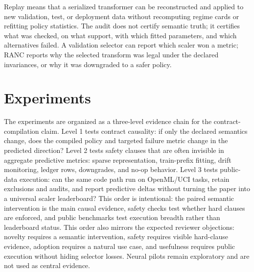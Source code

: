 \documentclass{article}
\begin{document}
Replay means that a serialized transformer can be reconstructed and applied to
new validation, test, or deployment data without recomputing regime cards or
refitting policy statistics. The audit does not certify semantic truth; it
certifies what was checked, on what support, with which fitted parameters, and
which alternatives failed. A validation selector can report which scaler won a
metric; RANC reports why the selected transform was legal under the declared
invariances, or why it was downgraded to a safer policy.

\section{Experiments}

The experiments are organized as a three-level evidence chain for the
contract-compilation claim. Level 1 tests contract causality: if only the
declared semantics change, does the compiled policy and targeted failure metric
change in the predicted direction? Level 2 tests safety clauses that are often
invisible in aggregate predictive metrics: sparse representation, train-prefix
fitting, drift monitoring, ledger rows, downgrades, and no-op behavior. Level 3
tests public-data execution: can the same code path run on OpenML/UCI tasks,
retain exclusions and audits, and report predictive deltas without turning the
paper into a universal scaler leaderboard? This order is intentional: the paired
semantic intervention is the main causal evidence, safety checks test whether
hard clauses are enforced, and public benchmarks test execution breadth rather
than leaderboard status. This order also mirrors the expected reviewer
objections: novelty requires a semantic intervention, safety requires visible
hard-clause evidence, adoption requires a natural use case, and usefulness
requires public execution without hiding selector losses. Neural pilots remain
exploratory and are not used as central evidence.
\end{document}
